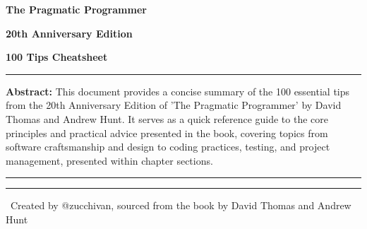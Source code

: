 \documentclass[11pt]{article}
\begin{document}
\thispagestyle{empty}
\begin{center}
    {\Huge\bfseries The Pragmatic Programmer\par}
    {\Large\bfseries 20th Anniversary Edition\par}
    \vspace{2cm}
    {\Huge\bfseries 100 Tips Cheatsheet\par}
    \vspace{3cm}

    \begin{minipage}{0.8\textwidth}
        \large
        \hrule
        \vspace{0.5em}
        \textbf{Abstract:} This document provides a concise summary of the 100 essential tips from the 20th Anniversary Edition of 'The Pragmatic Programmer' by David Thomas and Andrew Hunt. It serves as a quick reference guide to the core principles and practical advice presented in the book, covering topics from software craftsmanship and design to coding practices, testing, and project management, presented within chapter sections.
        \vspace{0.5em}
        \hrule
    \end{minipage}

    \vfill
    \rule{\textwidth}{0.4pt}
    \ Created by @zucchivan, sourced from the book by David Thomas and Andrew Hunt
\end{center}
\clearpage

\pagestyle{fancy}
\end{document}
